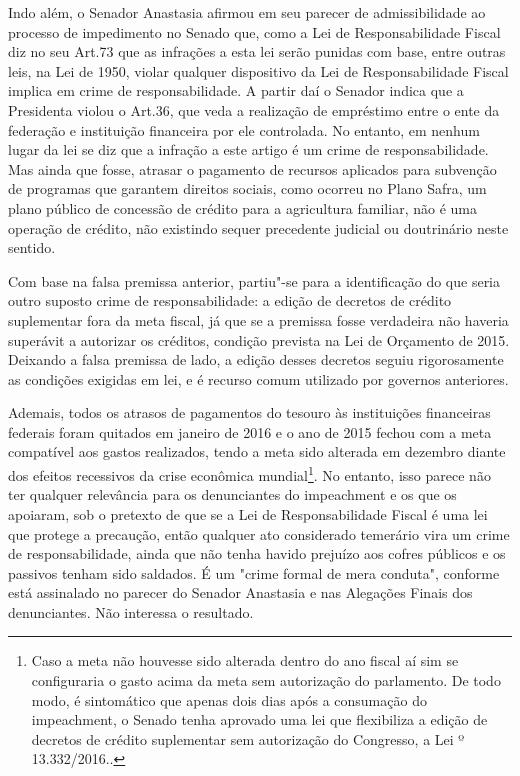 Indo além, o Senador Anastasia afirmou em seu parecer de admissibilidade
ao processo de impedimento no Senado que, como a Lei de Responsabilidade
Fiscal diz no seu Art.73 que as infrações a esta lei serão punidas com
base, entre outras leis, na Lei de 1950, violar qualquer dispositivo da
Lei de Responsabilidade Fiscal implica em crime de responsabilidade. A
partir daí o Senador indica que a Presidenta violou o Art.36, que veda a
realização de empréstimo entre o ente da federação e instituição
financeira por ele controlada. No entanto, em nenhum lugar da lei se diz
que a infração a este artigo é um crime de responsabilidade. Mas ainda
que fosse, atrasar o pagamento de recursos aplicados para subvenção de
programas que garantem direitos sociais, como ocorreu no Plano Safra, um
plano público de concessão de crédito para a agricultura familiar, não é
uma operação de crédito, não existindo sequer precedente judicial ou
doutrinário neste sentido.

Com base na falsa premissa anterior, partiu"-se para a identificação do
que seria outro suposto crime de responsabilidade: a edição de decretos
de crédito suplementar fora da meta fiscal, já que se a premissa fosse
verdadeira não haveria superávit a autorizar os créditos, condição
prevista na Lei de Orçamento de 2015. Deixando a falsa premissa de lado,
a edição desses decretos seguiu rigorosamente as condições exigidas em
lei, e é recurso comum utilizado por governos anteriores.

Ademais, todos os atrasos de pagamentos do tesouro às instituições
financeiras federais foram quitados em janeiro de 2016 e o ano de 2015
fechou com a meta compatível aos gastos realizados, tendo a meta sido
alterada em dezembro diante dos efeitos recessivos da crise econômica
mundial\footnote{Caso a meta não houvesse sido alterada dentro do ano
  fiscal aí sim se configuraria o gasto acima da meta sem autorização do
  parlamento. De todo modo, é sintomático que apenas dois dias após a
  consumação do impeachment, o Senado tenha aprovado uma lei que
  flexibiliza a edição de decretos de crédito suplementar sem
  autorização do Congresso, a Lei º 13.332/2016..}. No entanto, isso
parece não ter qualquer relevância para os denunciantes do impeachment e
os que os apoiaram, sob o pretexto de que se a Lei de Responsabilidade
Fiscal é uma lei que protege a precaução, então qualquer ato considerado
temerário vira um crime de responsabilidade, ainda que não tenha havido
prejuízo aos cofres públicos e os passivos tenham sido saldados. É um
"crime formal de mera conduta", conforme está assinalado no parecer do
Senador Anastasia e nas Alegações Finais dos denunciantes. Não interessa
o resultado.

